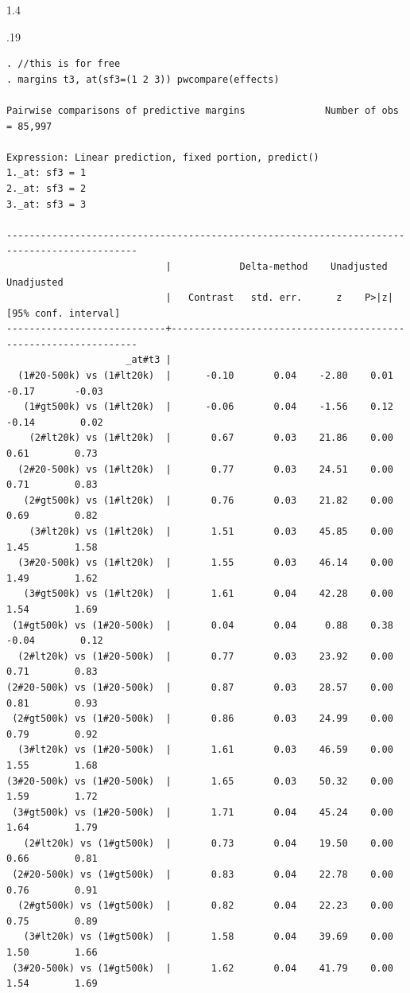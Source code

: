 \documentclass[10pt, letterpaper]{article}
\begin{document}
\begin{spacing}{1.4}
\begin{scriptsize}
\begin{spacing}{.19}
\begin{verbatim}
. //this is for free
. margins t3, at(sf3=(1 2 3)) pwcompare(effects)

Pairwise comparisons of predictive margins              Number of obs = 85,997

Expression: Linear prediction, fixed portion, predict()
1._at: sf3 = 1
2._at: sf3 = 2
3._at: sf3 = 3

---------------------------------------------------------------------------------------------
                            |            Delta-method    Unadjusted           Unadjusted
                            |   Contrast   std. err.      z    P>|z|     [95% conf. interval]
----------------------------+----------------------------------------------------------------
                     _at#t3 |
  (1#20-500k) vs (1#lt20k)  |      -0.10       0.04    -2.80    0.01        -0.17       -0.03
   (1#gt500k) vs (1#lt20k)  |      -0.06       0.04    -1.56    0.12        -0.14        0.02
    (2#lt20k) vs (1#lt20k)  |       0.67       0.03    21.86    0.00         0.61        0.73
  (2#20-500k) vs (1#lt20k)  |       0.77       0.03    24.51    0.00         0.71        0.83
   (2#gt500k) vs (1#lt20k)  |       0.76       0.03    21.82    0.00         0.69        0.82
    (3#lt20k) vs (1#lt20k)  |       1.51       0.03    45.85    0.00         1.45        1.58
  (3#20-500k) vs (1#lt20k)  |       1.55       0.03    46.14    0.00         1.49        1.62
   (3#gt500k) vs (1#lt20k)  |       1.61       0.04    42.28    0.00         1.54        1.69
 (1#gt500k) vs (1#20-500k)  |       0.04       0.04     0.88    0.38        -0.04        0.12
  (2#lt20k) vs (1#20-500k)  |       0.77       0.03    23.92    0.00         0.71        0.83
(2#20-500k) vs (1#20-500k)  |       0.87       0.03    28.57    0.00         0.81        0.93
 (2#gt500k) vs (1#20-500k)  |       0.86       0.03    24.99    0.00         0.79        0.92
  (3#lt20k) vs (1#20-500k)  |       1.61       0.03    46.59    0.00         1.55        1.68
(3#20-500k) vs (1#20-500k)  |       1.65       0.03    50.32    0.00         1.59        1.72
 (3#gt500k) vs (1#20-500k)  |       1.71       0.04    45.24    0.00         1.64        1.79
   (2#lt20k) vs (1#gt500k)  |       0.73       0.04    19.50    0.00         0.66        0.81
 (2#20-500k) vs (1#gt500k)  |       0.83       0.04    22.78    0.00         0.76        0.91
  (2#gt500k) vs (1#gt500k)  |       0.82       0.04    22.23    0.00         0.75        0.89
   (3#lt20k) vs (1#gt500k)  |       1.58       0.04    39.69    0.00         1.50        1.66
 (3#20-500k) vs (1#gt500k)  |       1.62       0.04    41.79    0.00         1.54        1.69

\end{verbatim}
\end{spacing}
\end{scriptsize}
\end{spacing}
\end{document}
